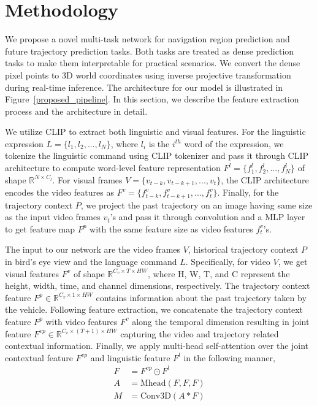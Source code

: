 \documentclass[letterpaper, 10 pt, conference]{ieeeconf}  %
\begin{document}
\section{Methodology}

We propose a novel multi-task network for navigation region prediction and future trajectory prediction tasks. Both tasks are treated as dense prediction tasks to make them interpretable for practical scenarios. We convert the dense pixel points to 3D world coordinates using inverse projective transformation during real-time inference. The architecture for our model is illustrated in Figure~\ref{proposed_pipeline}. In this section, we  describe the feature extraction process and the architecture in detail.

We utilize CLIP \cite{Radford2021LearningTV} to extract both linguistic and visual features. For the linguistic expression $L = \{l_1, l_2, ..., l_N\}$, where $l_i$ is the $i^{th}$ word of the expression, we tokenize the linguistic command using CLIP tokenizer and pass it through CLIP architecture to compute word-level feature representation $F^l = \{f^{l}_{1}, f^{l}_{2}, ..., f^{l}_{N}\}$ of shape $\mathbb R^{N \times C_l}$. For visual frames $V=\{v_{t-k}, v_{t-k+1}, ..., v_{t}\}$, the CLIP architecture encodes the video features as $F^v=\{f^{v}_{t-k}, f^{v}_{t-k+1}, ..., f^{v}_{t}\}$. Finally, for the trajectory context $P$, we project the past trajectory on an image having same size as the input video frames $v_t$'s and pass it through convolution and a MLP layer to get feature map $F^p$ with the same feature size as video features $f^{v}_{t}$'s.

The input to our network are the video frames $V$, historical trajectory context $P$ in bird's eye view and the language command $L$. Specifically, for video $V$, we get visual features $F^v$ of shape $ \mathbb R^{C_v \times T \times HW}$, where H, W, T, and C represent the height, width, time, and channel dimensions, respectively. The trajectory context feature $F^p \in \mathbb R^{C_v \times 1 \times HW}$ contains information about the past trajectory taken by the vehicle. Following feature extraction, we concatenate the trajectory context feature $F^p$ with video features $F^v$ along the temporal dimension resulting in joint feature $F^{vp} \in \mathbb R^{C_v \times (T+1) \times HW}$ capturing the video and trajectory related contextual information. Finally, we apply multi-head self-attention over the joint contextual feature $F^{vp}$ and linguistic feature $F^l$ in the following manner,
\begin{equation} \label{eq1}
\begin{split}
    F &= F^{vp} \odot F^l \\
    A &= \text{Mhead}(F, F, F)\\
    M &= \text{Conv3D}(A \ast F)
\end{split}
\end{equation}
\end{document}
